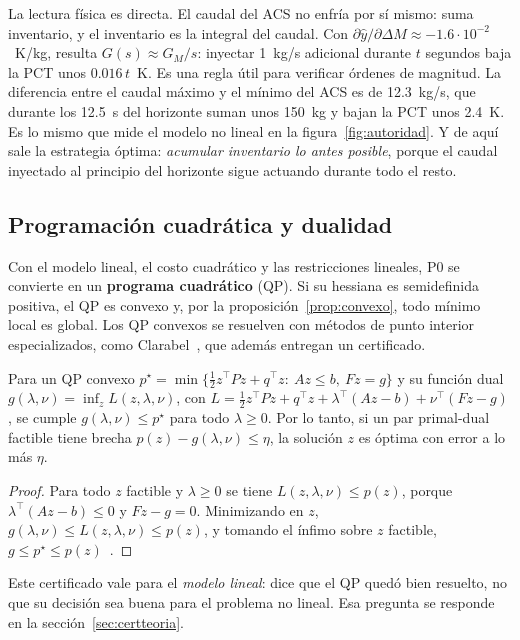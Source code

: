 \noindent La lectura física es directa. El caudal del ACS no enfría por sí mismo: suma
inventario, y el inventario es la integral del caudal. Con $\partial\hat y/\partial\Delta
M\approx-1.6\cdot10^{-2}$~K/kg, resulta $G(s)\approx G_M/s$: inyectar 1~kg/s adicional durante
$t$ segundos baja la PCT unos $0.016\,t$~K. Es una regla útil para verificar órdenes de magnitud.
La diferencia entre el caudal máximo y el mínimo del ACS es de 12.3~kg/s, que durante los 12.5~s
del horizonte suman unos 150~kg y bajan la PCT unos 2.4~K. Es lo mismo que mide el modelo no
lineal en la figura~\ref{fig:autoridad}. Y de aquí sale la estrategia óptima: \emph{acumular
inventario lo antes posible}, porque el caudal inyectado al principio del horizonte sigue
actuando durante todo el resto.

\subsection{Programación cuadrática y dualidad}
Con el modelo lineal, el costo cuadrático y las restricciones lineales, P0 se convierte en un
\textbf{programa cuadrático} (QP). Si su hessiana es semidefinida positiva, el QP es convexo y,
por la proposición~\ref{prop:convexo}, todo mínimo local es global. Los QP convexos se resuelven
con métodos de punto interior especializados, como Clarabel~\cite{goulart2024}, que además
entregan un certificado.

\begin{proposicion}\label{prop:dual}
Para un QP convexo $p^\star=\min\{\tfrac12z^\top Pz+q^\top z:\ Az\le b,\ Fz=g\}$ y su función
dual $g(\lambda,\nu)=\inf_zL(z,\lambda,\nu)$, con
$L=\tfrac12z^\top Pz+q^\top z+\lambda^\top(Az-b)+\nu^\top(Fz-g)$, se cumple $g(\lambda,\nu)\le p^\star$
para todo $\lambda\ge0$. Por lo tanto, si un par primal-dual factible tiene brecha
$p(z)-g(\lambda,\nu)\le\eta$, la solución $z$ es óptima con error a lo más $\eta$.
\end{proposicion}
\begin{proof}
Para todo $z$ factible y $\lambda\ge0$ se tiene $L(z,\lambda,\nu)\le p(z)$, porque
$\lambda^\top(Az-b)\le0$ y $Fz-g=0$. Minimizando en $z$, $g(\lambda,\nu)\le L(z,\lambda,\nu)\le
p(z)$, y tomando el ínfimo sobre $z$ factible, $g\le p^\star\le p(z)$~\cite{boyd2004}.
\end{proof}
\noindent Este certificado vale para el \emph{modelo lineal}: dice que el QP quedó bien
resuelto, no que su decisión sea buena para el problema no lineal. Esa pregunta se responde en
la sección~\ref{sec:certteoria}.

